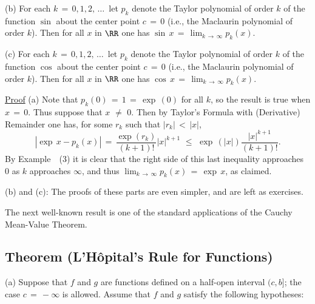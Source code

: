 {\V

        (b) For each $k \,=\, 0,1,2,\,{\ldots}\,$ let $p_{k}$ denote the Taylor polynomial of order $k$ of the function ${\sin}$ about the center point $c \,=\, 0$ (i.e., the Maclaurin polynomial of order $k$).
    Then for all $x$ in ${\RR}$ one has ${\sin}\,x \,=\, \lim_{k \,{\rightarrow}\, {\infty}} p_{k}(x)$.

\V

        (c) For each $k \,=\, 0,1,2,\,{\ldots}\,$ let $p_{k}$ denote the Taylor polynomial of order $k$ of the function ${\cos}$ about the center point $c \,=\, 0$ (i.e., the Maclaurin polynomial of order $k$).
    Then for all $x$ in ${\RR}$ one has ${\cos}\,x \,=\, \lim_{k \,{\rightarrow}\, {\infty}} p_{k}(x)$.

\V

        \underline{Proof} (a) Note that $p_{k}(0) \,=\, 1 \,=\, {\exp}\,(0)$ for all $k$, so the result is true when $x \,=\, 0$.
    Thus suppose that $x \,\,{\neq}\,\, 0$. Then by Taylor's Formula with (Derivative) Remainder one has, for some $r_{k}$ such that $|r_{k}|\,<\,|x|$,
        \begin{displaymath}
        |{\exp}\, x - p_{k}(x)| \,=\, \frac{{\exp}(r_{k})}{(k+1)!}|x|^{k+1}\,\,{\leq}\,\,{\exp}\,(|x|)\frac{|x|^{k+1}}{(k+1)!}.
        \end{displaymath}
    By Example~~(3) it is clear that the right side of this last inequality approaches~$0$ as $k$ approaches ${\infty}$,
    and thus $\lim_{k \,{\rightarrow}\, {\infty}} p_{k}(x) \,=\, {\exp}\,x$, as claimed.

\V

        (b) and (c): The proofs of these parts are even simpler, and are left as exercises.

\V
\V
}%

\VV

        The next well-known result is one of the standard applications of the Cauchy Mean-Value Theorem.

\V

             \subsection{\small{\bf Theorem} (L'H\^{o}pital's Rule for Functions)}
            \label{ThmE50.60}

\V

\hspace*{\parindent}(a) Suppose that $f$ and $g$ are functions defined on a half-open interval $(c,b]$; the case $c \,=\, -{\infty}$ is allowed.
    Assume that $f$ and $g$ satisfy the following hypotheses:

